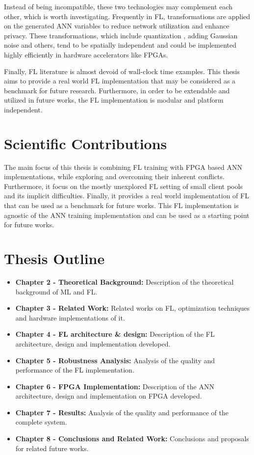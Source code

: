 Instead of being incompatible, these two technologies may complement each other, which is worth investigating. Frequently in FL, transformations are applied on the generated ANN variables to reduce network utilization and enhance privacy. These transformations, which include quantization \cite{Mills2020}, adding Gaussian noise \cite{Wei2020} and others, tend to be spatially independent and could be implemented highly efficiently in hardware accelerators like FPGAs.

Finally, FL literature is almost devoid of wall-clock time examples. This thesis aims to provide a real world FL implementation that may be considered as a benchmark for future research. Furthermore, in order to be extendable and utilized in future works, the FL implementation is modular and platform independent.


\section{Scientific Contributions}

The main focus of this thesis is combining FL training with FPGA based ANN implementations, while exploring and overcoming their inherent conflicts. Furthermore, it focus on the mostly unexplored FL setting of small client pools and its implicit difficulties. Finally, it provides a real world implementation of FL that can be used as a benchmark for future works. This FL implementation is agnostic of the ANN training implementation and can be used as a starting point for future works.

\section{Thesis Outline}
\begin{itemize}
    \item \textbf{Chapter 2 - Theoretical Background:} Description of the theoretical background of ML and FL.
    \item \textbf{Chapter 3 - Related Work:} Related works on FL, optimization techniques and hardware implementations of it.
    \item \textbf{Chapter 4 - FL architecture \& design:} Description of the FL architecture, design and implementation developed.
    \item \textbf{Chapter 5 - Robustness Analysis:} Analysis of the quality and performance of the FL implementation.
    \item \textbf{Chapter 6 - FPGA Implementation:} Description of the ANN architecture, design and implementation on FPGA developed.
    \item \textbf{Chapter 7 - Results:} Analysis of the quality and performance of the complete system.
    \item \textbf{Chapter 8 - Conclusions and Related Work:} Conclusions and proposals for related future works.
\end{itemize}
